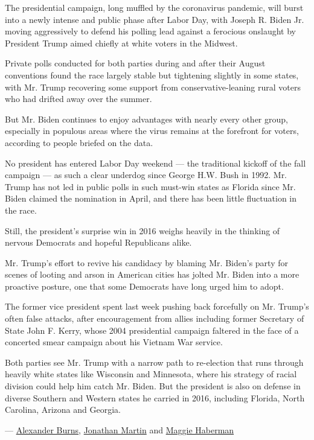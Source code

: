 The presidential campaign, long muffled by the coronavirus pandemic,
will burst into a newly intense and public phase after Labor Day, with
Joseph R. Biden Jr. moving aggressively to defend his polling lead
against a ferocious onslaught by President Trump aimed chiefly at white
voters in the Midwest.

Private polls conducted for both parties during and after their August
conventions found the race largely stable but tightening slightly in
some states, with Mr. Trump recovering some support from
conservative-leaning rural voters who had drifted away over the summer.

But Mr. Biden continues to enjoy advantages with nearly every other
group, especially in populous areas where the virus remains at the
forefront for voters, according to people briefed on the data.

No president has entered Labor Day weekend --- the traditional kickoff
of the fall campaign --- as such a clear underdog since George H.W. Bush
in 1992. Mr. Trump has not led in public polls in such must-win states
as Florida since Mr. Biden claimed the nomination in April, and there
has been little fluctuation in the race.

Still, the president's surprise win in 2016 weighs heavily in the
thinking of nervous Democrats and hopeful Republicans alike.

Mr. Trump's effort to revive his candidacy by blaming Mr. Biden's party
for scenes of looting and arson in American cities has jolted Mr. Biden
into a more proactive posture, one that some Democrats have long urged
him to adopt.

The former vice president spent last week pushing back forcefully on Mr.
Trump's often false attacks, after encouragement from allies including
former Secretary of State John F. Kerry, whose 2004 presidential
campaign faltered in the face of a concerted smear campaign about his
Vietnam War service.

Both parties see Mr. Trump with a narrow path to re-election that runs
through heavily white states like Wisconsin and Minnesota, where his
strategy of racial division could help him catch Mr. Biden. But the
president is also on defense in diverse Southern and Western states he
carried in 2016, including Florida, North Carolina, Arizona and Georgia.

---
\href{https://www.nytimes3xbfgragh.onion/by/alexander-burns}{Alexander
Burns},
\href{https://www.nytimes3xbfgragh.onion/by/jonathan-martin}{Jonathan
Martin} and
\href{https://www.nytimes3xbfgragh.onion/by/maggie-haberman}{Maggie
Haberman}

